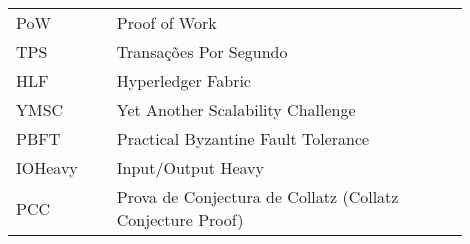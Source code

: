 

\begin{listaacron}

\begin{longtable}[l]{p{0.2\linewidth}p{0.7\linewidth}}

PoW & Proof of Work \\
TPS & Transações Por Segundo \\
HLF & Hyperledger Fabric \\
YMSC & Yet Another Scalability Challenge \\
PBFT & Practical Byzantine Fault Tolerance \\
IOHeavy & Input/Output Heavy \\
PCC & Prova de Conjectura de Collatz (Collatz Conjecture Proof)\\

\end{longtable}
\end{listaacron}




